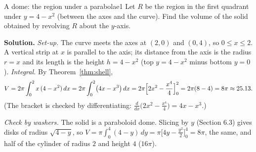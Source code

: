 \documentclass[11pt]{article}
\begin{document}
\begin{exmp}{A dome: the region under a parabola}{e1}
Let $R$ be the region in the first quadrant under $y=4-x^2$ (between the axes and the curve). Find the volume of the solid obtained by revolving $R$ about the $y$-axis.

\textbf{Solution.} \emph{Set-up.} The curve meets the axes at $(2,0)$ and $(0,4)$, so $0\le x\le2$. A vertical strip at $x$ is parallel to the axis; its distance from the axis is the radius $r=x$ and its length is the height $h=4-x^2$ (top $y=4-x^2$ minus bottom $y=0$).
\emph{Integral.} By Theorem~\ref{thm:shell},
\[
V=2\pi\int_0^2x\,(4-x^2)\,dx=2\pi\int_0^2\bigl(4x-x^3\bigr)\,dx=2\pi\Bigl[2x^2-\frac{x^4}4\Bigr]_0^2=2\pi(8-4)=8\pi\approx25.13 .
\]
(The bracket is checked by differentiating: $\frac{d}{dx}\bigl(2x^2-\frac{x^4}4\bigr)=4x-x^3$.)

\emph{Check by washers.} The solid is a paraboloid dome. Slicing by $y$ (Section 6.3) gives disks of radius $\sqrt{4-y}$, so $V=\pi\int_0^4(4-y)\,dy=\pi\bigl[4y-\frac{y^2}2\bigr]_0^4=8\pi$, the same, and half of the cylinder of radius $2$ and height $4$ ($16\pi$).


\end{exmp}
\end{document}
